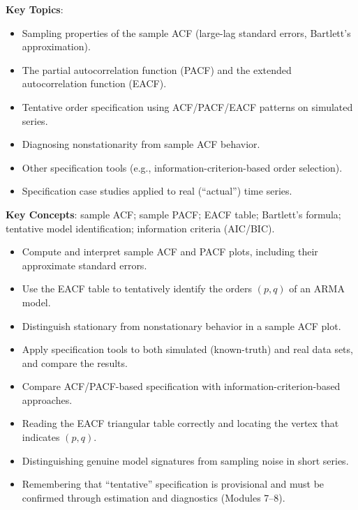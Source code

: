 \documentclass[11pt]{article}
\newcommand{\keytopics}{\textbf{\color{modblue}Key Topics}}
\newcommand{\keyconcepts}{\textbf{\color{modblue}Key Concepts}}
\begin{document}
\keytopics:
\begin{itemize}
  \item Sampling properties of the sample ACF (large-lag standard errors, Bartlett's approximation).
  \item The partial autocorrelation function (PACF) and the extended autocorrelation function (EACF).
  \item Tentative order specification using ACF/PACF/EACF patterns on simulated series.
  \item Diagnosing nonstationarity from sample ACF behavior.
  \item Other specification tools (e.g., information-criterion-based order selection).
  \item Specification case studies applied to real (``actual'') time series.
\end{itemize}

\keyconcepts: sample ACF; sample PACF; EACF table; Bartlett's formula; tentative model identification; information criteria (AIC/BIC).

\begin{objectives}
\begin{itemize}
  \item Compute and interpret sample ACF and PACF plots, including their approximate standard errors.
  \item Use the EACF table to tentatively identify the orders $(p,q)$ of an ARMA model.
  \item Distinguish stationary from nonstationary behavior in a sample ACF plot.
  \item Apply specification tools to both simulated (known-truth) and real data sets, and compare the results.
  \item Compare ACF/PACF-based specification with information-criterion-based approaches.
\end{itemize}
\end{objectives}

\begin{difficult}
\begin{itemize}
  \item Reading the EACF triangular table correctly and locating the vertex that indicates $(p,q)$.
  \item Distinguishing genuine model signatures from sampling noise in short series.
  \item Remembering that ``tentative'' specification is provisional and must be confirmed through estimation and diagnostics (Modules 7--8).
\end{itemize}
\end{difficult}
\end{document}
